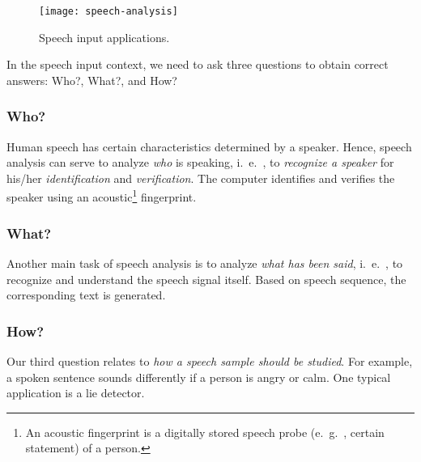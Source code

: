 \begin{figure}[h]
	\centering
	\texttt{[image: speech-analysis]}
	\caption{Speech input applications.}\label{fig:speech-input}
\end{figure}

In the speech input context, we need to ask three questions to obtain correct
answers: Who?, What?, and How?

\subsubsection*{Who?}

Human speech has certain characteristics determined by a speaker. Hence,
speech analysis can serve to analyze \textit{who} is speaking, i.\ e.\ , to \textit{recognize a speaker} for his/her \textit{identification} and \textit{verification}. The computer identifies and verifies the speaker using an acoustic\footnote{An acoustic fingerprint is a digitally stored speech probe (e.\ g.\ , certain statement) of a person.} fingerprint.

\subsubsection*{What?}

Another main task of speech analysis is to analyze \textit{what has been said}, i.\ e.\ , to recognize and understand the speech signal itself. Based on speech sequence,
the corresponding text is generated.

\subsubsection*{How?}
Our third question relates to \textit{how a speech sample should be studied}. For example, a spoken sentence sounds differently if a person is angry or calm. One typical application is a lie detector.


